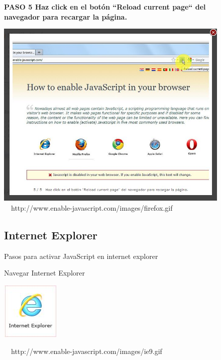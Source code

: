 \documentclass[11pt]{article} %
\begin{document}
\begin{figure}
\begin{center}
\begin{center}
\bf PASO 5
Haz click en el botón ``Reload current page`` del navegador para recargar la página.
\newline
\end{center}
\includegraphics[height=8 cm, width=8 cm] {imagenes/firefox 05.JPG}
\newline
\newline
\ 
\ {http://www.enable-javascript.com/images/firefox.gif }

\end{center}
\end{figure}

\begin{figure}
\subsection{Internet Explorer}
Pasos para activar JavaScript en internet explorer
\begin{center}
\begin{center}
Navegar Internet Explorer

\end{center}
\begin{center}
\includegraphics[height=3 cm, width=3 cm] {imagenes/explorer.JPG}
\end{center}

\ 
\  {http://www.enable-javascript.com/images/ie9.gif }

\end{center}
\end{figure}
\end{document}
